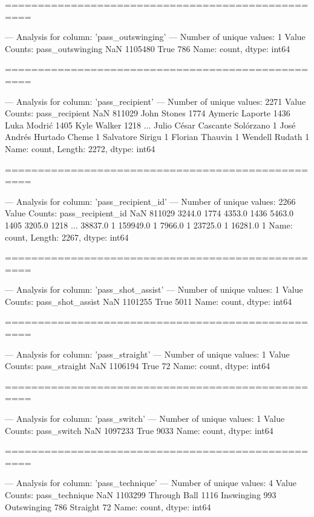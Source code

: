 ==================================================

--- Analysis for column: 'pass_outswinging' ---
Number of unique values: 1
Value Counts:
pass_outswinging
NaN     1105480
True        786
Name: count, dtype: int64

==================================================

--- Analysis for column: 'pass_recipient' ---
Number of unique values: 2271
Value Counts:
pass_recipient
NaN                               811029
John Stones                         1774
Aymeric Laporte                     1436
Luka Modrić                         1405
Kyle Walker                         1218
                                   ...  
Julio César Cascante Solórzano         1
José Andrés Hurtado Cheme              1
Salvatore Sirigu                       1
Florian Thauvin                        1
Wendell Rudath                         1
Name: count, Length: 2272, dtype: int64

==================================================

--- Analysis for column: 'pass_recipient_id' ---
Number of unique values: 2266
Value Counts:
pass_recipient_id
NaN         811029
3244.0        1774
4353.0        1436
5463.0        1405
3205.0        1218
             ...  
38837.0          1
159949.0         1
7966.0           1
23725.0          1
16281.0          1
Name: count, Length: 2267, dtype: int64

==================================================

--- Analysis for column: 'pass_shot_assist' ---
Number of unique values: 1
Value Counts:
pass_shot_assist
NaN     1101255
True       5011
Name: count, dtype: int64

==================================================

--- Analysis for column: 'pass_straight' ---
Number of unique values: 1
Value Counts:
pass_straight
NaN     1106194
True         72
Name: count, dtype: int64

==================================================

--- Analysis for column: 'pass_switch' ---
Number of unique values: 1
Value Counts:
pass_switch
NaN     1097233
True       9033
Name: count, dtype: int64

==================================================

--- Analysis for column: 'pass_technique' ---
Number of unique values: 4
Value Counts:
pass_technique
NaN             1103299
Through Ball       1116
Inswinging          993
Outswinging         786
Straight             72
Name: count, dtype: int64

